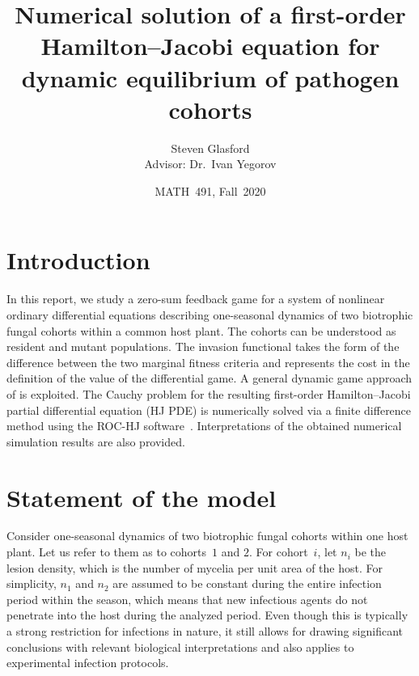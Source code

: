 \documentclass[a4paper,12pt]{article}
\begin{document}
\title{Numerical solution of a first-order Hamilton--Jacobi equation for dynamic equilibrium of pathogen cohorts}


\author{Steven Glasford \\ Advisor: Dr.~Ivan Yegorov}


\date{MATH~491, Fall~2020}



\maketitle



\section{Introduction}

In this report, we study a zero-sum feedback game for a system of nonlinear ordinary differential equations describing
one-seasonal dynamics of two biotrophic fungal cohorts within a common host plant. The cohorts can be understood as
resident and mutant populations. The invasion functional takes the form of the difference between the two marginal fitness
criteria and represents the cost in the definition of the value of the differential game. A general dynamic game approach
of \cite{YegorovGrognardMailleretHalkettBernhard2019} is exploited. The Cauchy problem for the resulting first-order
Hamilton--Jacobi partial differential equation (HJ PDE) is numerically solved via a finite difference method using
the ROC-HJ software~\cite{ROCHJ2019}. Interpretations of the obtained numerical simulation results are also
provided.


\section{Statement of the model}

Consider one-seasonal dynamics of two biotrophic fungal cohorts within one host plant. Let us refer to them as to
cohorts~$ 1 $ and $ 2 $. For cohort~$ i $, let $ n_i $ be the lesion density, which is the number of mycelia per unit area of
the host. For simplicity, $ n_1 $ and $ n_2 $ are assumed to be constant during the entire infection period within the season,
which means that new infectious agents do not penetrate into the host during the analyzed period. Even though this is typically
a strong restriction for infections in nature, it still allows for drawing significant conclusions with relevant biological
interpretations and also applies to experimental infection protocols.
\end{document}

